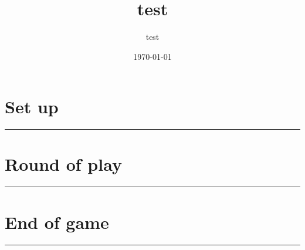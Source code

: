 \documentclass{scrartcl}%
\title{test}%
\author{test}%
\date{\today}%
\begin{document}
%
\normalsize%
\maketitle\thispagestyle{header}%
\pagestyle{header}%
\sectionfont{\color{blue}}%
\subsectionfont{\color{blue}}%
\subsubsectionfont{\color{blue}}%
\section{ Set up
}%
\label{sec:Setup}%
\textcolor{blue}{\rule{18cm}{0.07cm}}\break

%
\sectionfont{\color{mygreen}}%
\subsectionfont{\color{mygreen}}%
\subsubsectionfont{\color{mygreen}}%
\section{ Round of play
}%
\label{sec:Roundofplay}%
\textcolor{mygreen}{\rule{18cm}{0.07cm}}\break

%
\sectionfont{\color{red}}%
\subsectionfont{\color{red}}%
\subsubsectionfont{\color{red}}%
\section{ End of game}%
\label{sec:Endofgame}%
\textcolor{red}{\rule{18cm}{0.07cm}}\break

%
\end{document}

